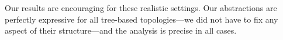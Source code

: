 \documentclass[numbers, 10pt]{sigplanconf}
\newcommand{\EG}{\emph{e.g.}}
\newcommand{\para}[1]{\paragraph*{\textbf{#1}}}
\begin{document}
Our results are encouraging for these realistic settings. Our abstractions are perfectly expressive for all tree-based topologies---we did not have to fix any aspect of their structure---and the analysis is precise in all cases.



%
\end{document}
